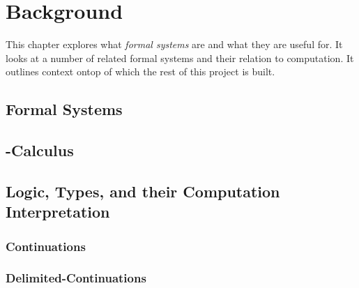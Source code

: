 \chapter{Background}

This chapter explores what \emph{formal systems} are and what they are useful for. It looks at a number of related formal systems and their relation to computation. It outlines context ontop of which the rest of this project is built.

\section{Formal Systems}

\section{\lam-Calculus}

\begin{figure}[!h]
\end{figure}

\begin{figure}[!h]
\end{figure}

\section{Logic, Types, and their Computation Interpretation}
\subsection{Continuations}
\subsection{Delimited-Continuations}

